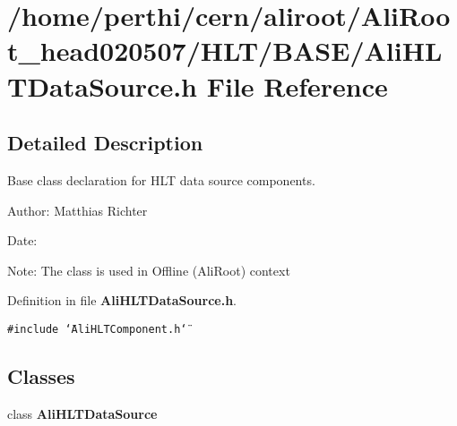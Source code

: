 \section{/home/perthi/cern/aliroot/Ali\-Root\_\-head020507/HLT/BASE/Ali\-HLTData\-Source.h File Reference}
\label{AliHLTDataSource_8h}


\subsection{Detailed Description}
Base class declaration for HLT data source components. 

\begin{Desc}
\item[Author:]Matthias Richter \end{Desc}
\begin{Desc}
\item[Date:]\end{Desc}
\begin{Desc}
\item[Note:]The class is used in Offline (Ali\-Root) context\end{Desc}


Definition in file {\bf Ali\-HLTData\-Source.h}.

{\tt \#include \char`\"{}Ali\-HLTComponent.h\char`\"{}}\par
\subsection*{Classes}
\begin{CompactItemize}
\item 
class {\bf Ali\-HLTData\-Source}
\end{CompactItemize}
